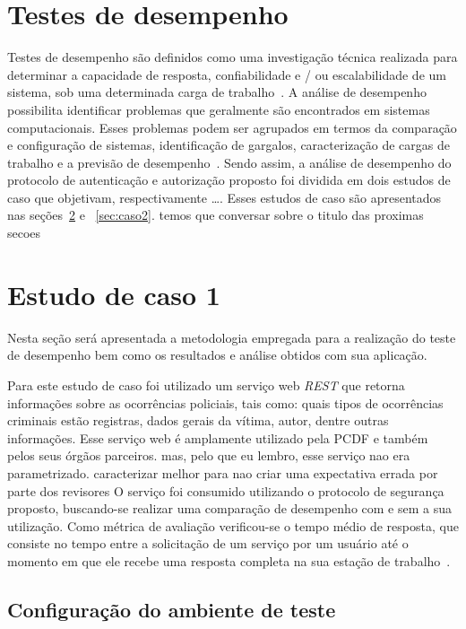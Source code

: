 \section{Testes de desempenho}

Testes de desempenho são definidos como uma investigação técnica realizada para determinar a capacidade de resposta, confiabilidade e / ou escalabilidade de um sistema, sob uma determinada carga de trabalho~\cite{Meier2007}.
A análise de desempenho possibilita identificar problemas que geralmente são encontrados em sistemas computacionais. Esses problemas podem ser agrupados em termos da 
comparação e configuração de sistemas, identificação de gargalos, caracterização de cargas de trabalho e a previsão de desempenho~\cite{jain1991art}. Sendo assim, a análise de desempenho do protocolo de autenticação e autorização proposto foi dividida em dois estudos de caso que {\color{red}objetivam, respectivamente \ldots}. Esses estudos de caso 
são apresentados nas seções~\ref{sec:caso1} e ~\ref{sec:caso2}. {\color{red}temos que conversar sobre o titulo das proximas secoes} 

\section{Estudo de caso 1}\label{sec:caso1}

Nesta seção será apresentada a metodologia empregada para a realização do teste de desempenho bem como os resultados e análise obtidos com sua aplicação.

Para este estudo de caso foi utilizado um serviço web \emph{REST} que retorna informações sobre as ocorrências policiais, tais como: quais tipos de ocorrências criminais estão registras, dados gerais da vítima, autor, dentre outras informações. Esse serviço web é amplamente utilizado pela PCDF e também pelos seus órgãos parceiros. {\color{red}mas, pelo que eu lembro, esse servi\c co nao era parametrizado. caracterizar melhor para nao criar uma expectativa errada por parte dos revisores} O serviço foi consumido utilizando o protocolo de segurança proposto, buscando-se realizar uma comparação de desempenho com e sem a sua utilização. Como métrica de avaliação verificou-se o tempo médio de resposta, que consiste no tempo entre a solicitação de um serviço por um usuário até o momento em que ele recebe uma resposta completa na sua estação de trabalho~\cite{ Molyneaux2009}.

\subsection{Configuração do ambiente de teste}

